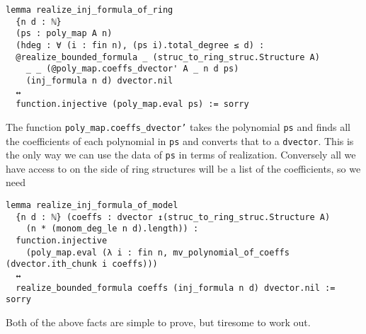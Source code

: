 \begin{lstlisting}
lemma realize_inj_formula_of_ring
  {n d : ℕ}
  (ps : poly_map A n)
  (hdeg : ∀ (i : fin n), (ps i).total_degree ≤ d) :
  @realize_bounded_formula _ (struc_to_ring_struc.Structure A)
    _ _ (@poly_map.coeffs_dvector' A _ n d ps)
    (inj_formula n d) dvector.nil
  ↔
  function.injective (poly_map.eval ps) := sorry \end{lstlisting}

The function \texttt{poly\_map.coeffs\_dvector'} takes the polynomial \texttt{ps}
and finds all the coefficients of each polynomial in \texttt{ps}
and converts that to a \texttt{dvector}.
This is the only way we can use the data of \texttt{ps} in terms of realization.
Conversely all we have access to on the side of ring structures
will be a list of the coefficients, so we need

\begin{lstlisting}
lemma realize_inj_formula_of_model
  {n d : ℕ} (coeffs : dvector ↥(struc_to_ring_struc.Structure A)
    (n * (monom_deg_le n d).length)) :
  function.injective
    (poly_map.eval (λ i : fin n, mv_polynomial_of_coeffs (dvector.ith_chunk i coeffs)))
  ↔
  realize_bounded_formula coeffs (inj_formula n d) dvector.nil := sorry
\end{lstlisting}

Both of the above facts are simple to prove,
but tiresome to work out.
